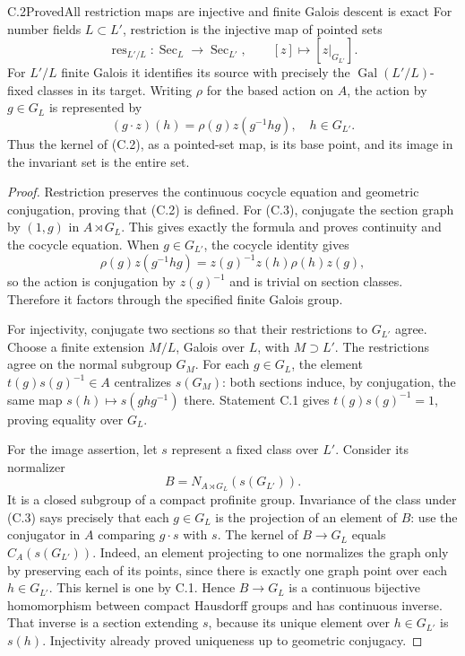 \begin{statement}{C.2}{Proved}{All restriction maps are injective and finite Galois descent is exact}
For number fields $L\subset L'$, restriction is the injective
map of pointed sets
\[
 \operatorname{res}_{L'/L}:\operatorname{Sec}_L
                   \longrightarrow\operatorname{Sec}_{L'},
 \qquad [z]\longmapsto[z|_{G_{L'}}].                        \tag{C.2}
\]
For $L'/L$ finite Galois it identifies its source with precisely
the $\operatorname{Gal}(L'/L)$-fixed classes in its target.
Writing $\rho$ for the based action on $A$, the action by
$g\in G_L$ is represented by
\[
       (g\cdot z)(h)=\rho(g)z(g^{-1}hg),\quad h\in G_{L'}.
                                                               \tag{C.3}
\]
Thus the kernel of (C.2), as a pointed-set map, is its base
point, and its image in the invariant set is the entire set.
\end{statement}
\begin{proof}
Restriction preserves the continuous cocycle equation and
geometric conjugation, proving that (C.2) is defined.
For (C.3), conjugate the section graph by $(1,g)$ in
$A\rtimes G_L$.  This gives exactly the formula and proves
continuity and the cocycle equation.  When $g\in G_{L'}$,
the cocycle identity gives
\[
 \rho(g)z(g^{-1}hg)=z(g)^{-1}z(h)\rho(h)z(g),
\]
so the action is conjugation by $z(g)^{-1}$ and is trivial
on section classes.  Therefore it factors through the
specified finite Galois group.

For injectivity, conjugate two sections so that their
restrictions to $G_{L'}$ agree.  Choose a finite extension
$M/L$, Galois over $L$, with $M\supset L'$.
The restrictions agree on the normal subgroup $G_M$.
For each $g\in G_L$, the element $t(g)s(g)^{-1}\in A$
centralizes $s(G_M)$: both sections induce, by conjugation,
the same map $s(h)\mapsto s(ghg^{-1})$ there.
Statement C.1 gives $t(g)s(g)^{-1}=1$, proving equality
over $G_L$.

For the image assertion, let $s$ represent a fixed class
over $L'$.  Consider its normalizer
\[
       B=N_{A\rtimes G_L}(s(G_{L'})).
\]
It is a closed subgroup of a compact profinite group.
Invariance of the class under (C.3) says precisely that
each $g\in G_L$ is the projection of an element of $B$:
use the conjugator in $A$ comparing $g\cdot s$ with $s$.
The kernel of $B\to G_L$ equals
$C_A(s(G_{L'}))$.  Indeed, an element projecting to one
normalizes the graph only by preserving each of its
points, since there is exactly one graph point over
each $h\in G_{L'}$.
This kernel is one by C.1.  Hence $B\to G_L$ is a
continuous bijective homomorphism between compact
Hausdorff groups and has continuous inverse.  That
inverse is a section extending $s$, because its unique
element over $h\in G_{L'}$ is $s(h)$.
Injectivity already proved uniqueness up to geometric
conjugacy.
\end{proof}

